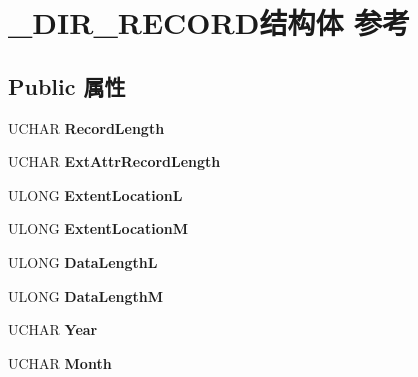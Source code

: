\hypertarget{struct___d_i_r___r_e_c_o_r_d}{}\section{\+\_\+\+D\+I\+R\+\_\+\+R\+E\+C\+O\+R\+D结构体 参考}
\label{struct___d_i_r___r_e_c_o_r_d}
\subsection*{Public 属性}
\begin{DoxyCompactItemize}
\item 
\mbox{\label{struct___d_i_r___r_e_c_o_r_d_ac47a049319593eeb0bef7653efea07d0}} 
U\+C\+H\+AR {\bfseries Record\+Length}
\item 
\mbox{\label{struct___d_i_r___r_e_c_o_r_d_a5da4a32eaec9705ea33e0fa2c3fd1fa9}} 
U\+C\+H\+AR {\bfseries Ext\+Attr\+Record\+Length}
\item 
\mbox{\label{struct___d_i_r___r_e_c_o_r_d_aef5eb43c97ab0bac99dfa1f399718b7b}} 
U\+L\+O\+NG {\bfseries Extent\+LocationL}
\item 
\mbox{\label{struct___d_i_r___r_e_c_o_r_d_ae6bb57a77125d3e612cf60c44b57b75d}} 
U\+L\+O\+NG {\bfseries Extent\+LocationM}
\item 
\mbox{\label{struct___d_i_r___r_e_c_o_r_d_af48d5078bca43ecf9e2a6db4d9ed7f21}} 
U\+L\+O\+NG {\bfseries Data\+LengthL}
\item 
\mbox{\label{struct___d_i_r___r_e_c_o_r_d_a13ea05c2a1f298680cb2c2ada85d975f}} 
U\+L\+O\+NG {\bfseries Data\+LengthM}
\item 
\mbox{\label{struct___d_i_r___r_e_c_o_r_d_a9814d67e0c4d2544b0150b207b18c736}} 
U\+C\+H\+AR {\bfseries Year}
\item 
\mbox{\label{struct___d_i_r___r_e_c_o_r_d_ae958a30d6abff455335ff4ce226aacdd}} 
U\+C\+H\+AR {\bfseries Month}
\item 

\end{DoxyCompactItemize}
